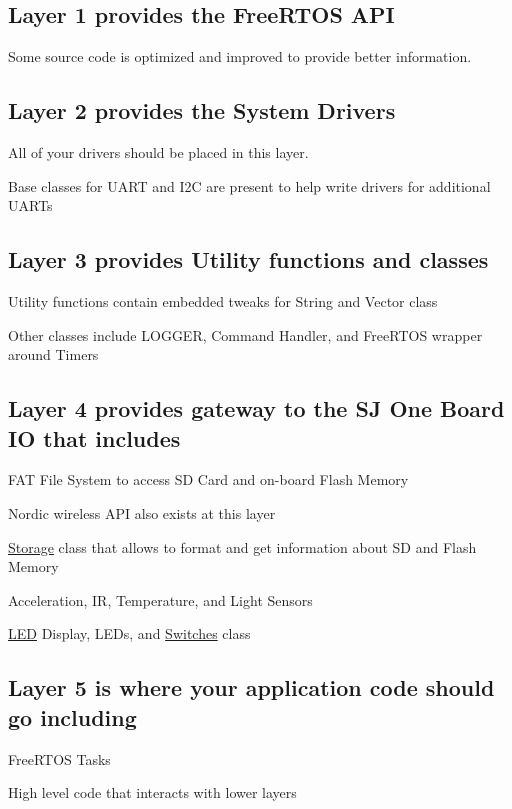 \subsection*{Layer 1 provides the Free\+R\+T\+OS A\+PI}


\begin{DoxyItemize}
\item Some source code is optimized and improved to provide better information.
\end{DoxyItemize}

\subsection*{Layer 2 provides the System Drivers}


\begin{DoxyItemize}
\item All of your drivers should be placed in this layer.
\item Base classes for U\+A\+RT and I2C are present to help write drivers for additional U\+A\+R\+Ts
\end{DoxyItemize}

\subsection*{Layer 3 provides Utility functions and classes}


\begin{DoxyItemize}
\item Utility functions contain embedded tweaks for String and Vector class
\item Other classes include L\+O\+G\+G\+ER, Command Handler, and Free\+R\+T\+OS wrapper around Timers
\end{DoxyItemize}

\subsection*{Layer 4 provides gateway to the SJ One Board IO that includes}


\begin{DoxyItemize}
\item F\+AT File System to access SD Card and on-\/board Flash Memory
\item Nordic wireless A\+PI also exists at this layer
\item \hyperlink{classStorage}{Storage} class that allows to format and get information about SD and Flash Memory
\item Acceleration, IR, Temperature, and Light Sensors
\item \hyperlink{classLED}{L\+ED} Display, L\+E\+Ds, and \hyperlink{classSwitches}{Switches} class
\end{DoxyItemize}

\subsection*{Layer 5 is where your application code should go including}


\begin{DoxyItemize}
\item Free\+R\+T\+OS Tasks
\item High level code that interacts with lower layers 
\end{DoxyItemize}
